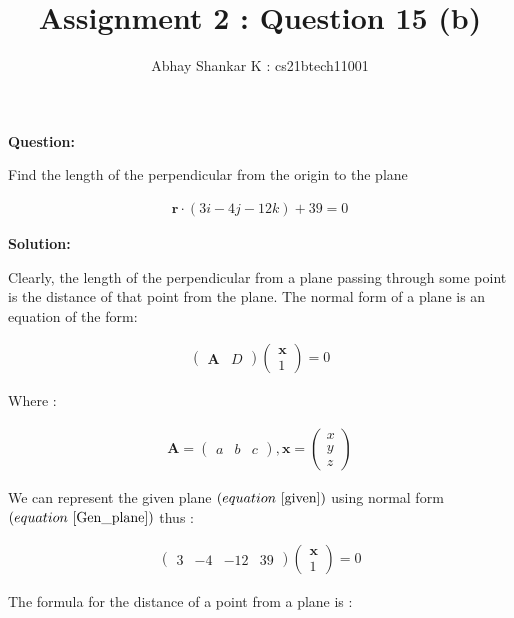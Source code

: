 \documentclass[journal,12pt,twocolumn]{IEEEtran}
\begin{document}
	\title{Assignment 2 : Question 15 (b)}
	\author{ Abhay Shankar K : cs21btech11001}

	\maketitle

	\bigskip

	\providecommand{\brak}[1]{\ensuremath{\left(#1\right)}}
	\providecommand{\abs}[1]{\left\vert#1\right\vert}
	\providecommand{\norm}[1]{\left\lVert#1\right\rVert}
	\newcommand{\solution}{\noindent \textbf{Solution: }}
	\newcommand{\question}{\noindent \textbf{Question: }}

	\newcommand{\myvec}[1]{\ensuremath{\begin{pmatrix}#1\end{pmatrix}}}
	\let\vec\mathbf


	\question


	Find the length of the perpendicular from the origin to the plane
	
	\begin{align} 
		\vec{r} \cdot \brak{3i - 4j - 12k} + 39 = 0
			\label{given}
	\end{align}


	\solution
	
	
	Clearly, the length of the perpendicular from a plane passing through some point is the distance of that point from the plane.
	The normal form of a plane is an equation of the form:
	
	\begin{align}
		\myvec{\vec{A} & D} \myvec{\vec{x} \\ 1} = 0
			\label{Gen_plane}
	\end{align}


	Where :
	
	\begin{align}
		\vec{A} = \myvec{a & b & c}, 
		\vec{x} = \myvec{x \\ y \\ z}
	\end{align}


	We can represent the given plane \brak{equation ~\eqref{given}} using normal form \brak{equation ~\eqref{Gen_plane}} thus :
	
	\begin{align}
		\myvec{3 & -4 & -12 & 39} \myvec{\vec{x} \\ 1} = 0
			\label{pln_nrm}
	\end{align}
	
	
	The formula for the distance of a point from a plane is :
	
\end{document}
